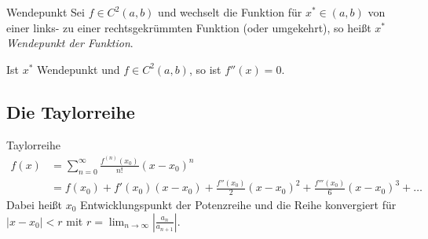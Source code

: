 \documentclass[german]{spicker}
\renewcommand{\abs}[1]{\left| #1 \right|}
\begin{document}
\begin{defi}{Wendepunkt}
    Sei $f \in C^2(a, b)$ und wechselt die Funktion für $x^* \in (a, b)$ von einer links- zu einer rechtsgekrümmten Funktion (oder umgekehrt), so heißt $x^*$ \emph{Wendepunkt der Funktion}.

    Ist $x^*$ Wendepunkt und $f \in C^2(a, b)$, so ist $f''(x) = 0$.
\end{defi}

\subsection{Die Taylorreihe}

\begin{defi}{Taylorreihe}
    $$
        \begin{aligned}
            f(x) & = \sum^\infty_{n=0} \frac{f^{(n)}(x_0)}{n!} (x-x_0)^n                                           \\
                 & = f(x_0) + f'(x_0)(x-x_0) + \frac{f''(x_0)}{2}(x-x_0)^2 + \frac{f'''(x_0)}{6}(x-x_0)^3 + \ldots
        \end{aligned}
    $$
    Dabei heißt $x_0$ Entwicklungspunkt der Potenzreihe und die Reihe konvergiert für $\abs{x-x_0} < r$ mit $r = \lim_{n\to\infty}\abs{\frac{a_n}{a_{n+1}}}$.
\end{defi}
\end{document}
